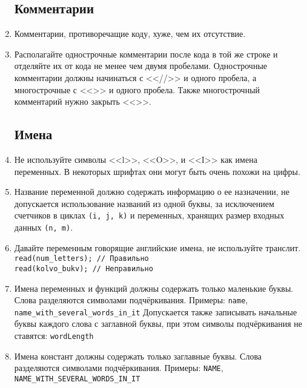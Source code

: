 \documentclass[11pt,a4paper,oneside]{article}
\begin{document}
\begin{enumerate}
\subsection*{Комментарии}
    
     \item Комментарии, противоречащие коду, хуже, чем их отсутствие.
     \item Располагайте однострочные комментарии после кода в той же строке и отделяйте
           их от кода не менее чем двумя пробелами. Однострочные комментарии должны начинаться с <<//>> и
           одного пробела, а многострочные с <<{>>  и одного пробела. Также многострочный комментарий нужно
           закрыть <<}>>. 

\subsection*{Имена}

     \item Не используйте символы <<l>>, <<O>>, и <<I>> как имена переменных. 
           В некоторых шрифтах они могут быть очень похожи на цифры.
     \item Название переменной должно содержать информацию о ее назначении, 
            не допускается использование названий из одной буквы, за исключением счетчиков в циклах
            \texttt{(i, j, k)} и переменных, хранящих размер входных данных \texttt{(n, m)}.
     \item Давайте переменным говорящие английские имена, не используйте транслит.
           \\ \texttt{read(num\_letters); // Правильно}
           \\ \texttt{read(kolvo\_bukv); \quad // Неправильно}
     \item Имена переменных и функций должны содержать только маленькие буквы. Слова
           разделяются символами подчёркивания. Примеры:
           \texttt{name}, \texttt{name\_with\_several\_words\_in\_it}
           Допускается также записывать начальные буквы каждого слова с заглавной буквы,
           при этом символы подчёркивания не ставятся: \texttt{wordLength}  
     \item Имена констант должны содержать только заглавные буквы. Слова разделяются
           символами подчёркивания. Примеры: \texttt{NAME}, \texttt{NAME\_WITH\_SEVERAL\_WORDS\_IN\_IT}


\end{enumerate}
\end{document}
